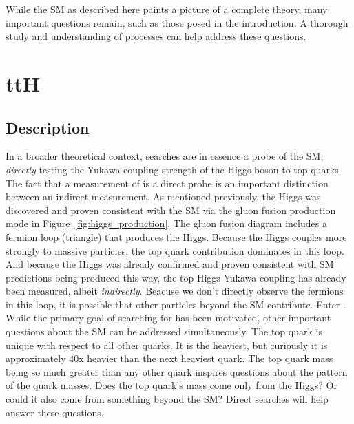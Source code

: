 While the SM as described here paints a picture of a complete theory, many important questions remain, such as those posed in the introduction.
A thorough study and understanding of \tth processes can help address these questions.  

\section{ttH}
\label{sec:tth}
\subsection{Description}
In a broader theoretical context, \tth searches are in essence a probe of the SM, \emph{directly} testing the Yukawa coupling strength of the Higgs boson to top quarks. The fact that a
measurement of \tth is a direct probe is an important distinction between an indirect measurement. As mentioned previously, the Higgs was discovered and proven
consistent with the SM via the gluon fusion production mode in Figure~\ref{fig:higgs_production}. The gluon fusion diagram includes a fermion loop (triangle)
that produces the Higgs. Because the Higgs couples more strongly to massive particles, the top quark contribution dominates in this loop. And
because the Higgs was already confirmed and proven consistent with SM predictions being produced this way, the top-Higgs Yukawa coupling has already been
measured, albeit \emph{indirectly}. Beacuse we don't directly observe the fermions in this loop, it is possible that other particles beyond the SM contribute.
Enter \tth. While the primary goal of searching for \tth has been motivated,
other important questions about the SM can be addressed simultaneously. The top quark is unique with respect to all other quarks. It is the heaviest, but curiously
it is approximately 40x heavier than the next heaviest quark. The top quark mass
being so much greater than any other quark inspires questions about the pattern of the quark masses. Does the top quark's mass come only from the Higgs? Or could
it also come from something beyond the SM? Direct \tth searches will help answer these questions. 


